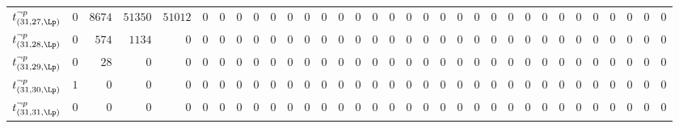 \begin{tabular}{r|rrrrrrrrrrrrrrrrrrrrrrrrrrrrrrrr}
  $t^{\neg p}_{(31,27,\Lp)}$ & $0$ & $8674$ & $51350$ & $51012$ & $0$ & $0$ & $0$ & $0$ & $0$ & $0$ & $0$ & $0$ & $0$ & $0$ & $0$ & $0$ & $0$ & $0$ & $0$ & $0$ & $0$ & $0$ & $0$ & $0$ & $0$ & $0$ & $0$ & $0$ & $0$ & $0$ & $0$ & $0$ \\
  $t^{\neg p}_{(31,28,\Lp)}$ & $0$ & $574$ & $1134$ & $0$ & $0$ & $0$ & $0$ & $0$ & $0$ & $0$ & $0$ & $0$ & $0$ & $0$ & $0$ & $0$ & $0$ & $0$ & $0$ & $0$ & $0$ & $0$ & $0$ & $0$ & $0$ & $0$ & $0$ & $0$ & $0$ & $0$ & $0$ & $0$ \\
  $t^{\neg p}_{(31,29,\Lp)}$ & $0$ & $28$ & $0$ & $0$ & $0$ & $0$ & $0$ & $0$ & $0$ & $0$ & $0$ & $0$ & $0$ & $0$ & $0$ & $0$ & $0$ & $0$ & $0$ & $0$ & $0$ & $0$ & $0$ & $0$ & $0$ & $0$ & $0$ & $0$ & $0$ & $0$ & $0$ & $0$ \\
  $t^{\neg p}_{(31,30,\Lp)}$ & $1$ & $0$ & $0$ & $0$ & $0$ & $0$ & $0$ & $0$ & $0$ & $0$ & $0$ & $0$ & $0$ & $0$ & $0$ & $0$ & $0$ & $0$ & $0$ & $0$ & $0$ & $0$ & $0$ & $0$ & $0$ & $0$ & $0$ & $0$ & $0$ & $0$ & $0$ & $0$ \\
  $t^{\neg p}_{(31,31,\Lp)}$ & $0$ & $0$ & $0$ & $0$ & $0$ & $0$ & $0$ & $0$ & $0$ & $0$ & $0$ & $0$ & $0$ & $0$ & $0$ & $0$ & $0$ & $0$ & $0$ & $0$ & $0$ & $0$ & $0$ & $0$ & $0$ & $0$ & $0$ & $0$ & $0$ & $0$ & $0$ & $0$ \\
\end{tabular}

